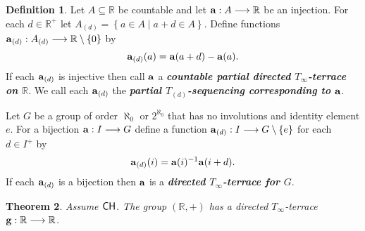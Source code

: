 \documentclass{amsart}
\newtheorem{theorem}{Theorem}
\theoremstyle{definition}
\newtheorem{definition}[theorem]{Definition}
\theoremstyle{remark}
\newcommand{\R}{\mathbb{R}}
\newcommand{\CH}{\textup{\textsf{CH}}}
\newcommand{\st}{\; | \;}
\newcommand{\set}[2]{\left\{#1\st #2 \right\}}
\newcommand{\To}{\longrightarrow}
\renewcommand{\a}{\textup{\textbf{a}}}
\newcommand{\g}{\textup{\textbf{g}}}
\begin{document}
\begin{definition}
Let $A \subseteq \R$ be countable and let $\a: A \To \R$ be an injection. For each $d \in \R^+$ let $A_{(d)} = \set{a \in A}{a+d \in A}$. Define functions $\a_{(d)}: A_{(d)} \To \R \setminus \{ 0 \}$ by $$\a_{(d)}(a) = \a(a+d)-\a(a).$$ If each $\a_{(d)}$ is injective then call $\a$ a \textbf{\emph{countable partial directed $T_\infty$-terrace on $\R$}}. We call each $\a_{(d)}$ the \textbf{\emph{partial $T_{(d)}$-sequencing corresponding to $\a$}}.

Let $G$ be a group of order $\aleph_0$ or $2^{\aleph_0}$ that has no involutions and identity element $e$. For a bijection $\a:I \To G$ define a function $\a_{(d)}: I \To G \setminus \{e\}$ for each $d \in I^+$ by $$\a_{(d)}(i)=\a(i)^{-1}\a(i+d).$$ If each $\a_{(d)}$ is a bijection then $\a$ is a \textbf{\emph{directed $T_\infty$-terrace for $G$}}.
\end{definition}
\begin{theorem}
Assume $\CH$. The group $(\R, +)$ has a directed $T_\infty$-terrace $\g: \R \To \R$. 
\end{theorem}
\end{document}
